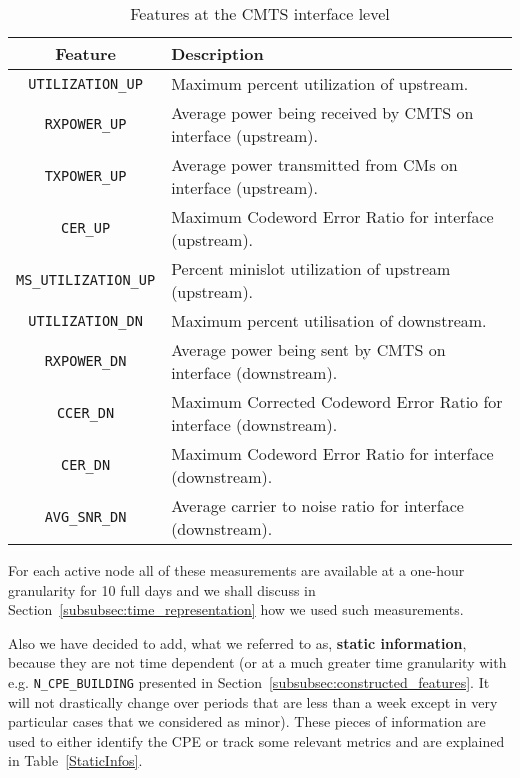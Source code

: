 \begin{table}[h]
\begin{center}
\begin{tabular}{c l}
\hline
\textbf{Feature} & \textbf{Description}\\ 
\hline\hline
\texttt{UTILIZATION\_UP} & Maximum percent utilization of upstream.\\
\hline
\texttt{RXPOWER\_UP} & Average power being received by CMTS on interface (upstream).\\
\hline
\texttt{TXPOWER\_UP} & Average power transmitted from CMs on interface (upstream).\\
\hline
\texttt{CER\_UP} & Maximum Codeword Error Ratio for interface (upstream).\\
\hline
\texttt{MS\_UTILIZATION\_UP} & Percent minislot utilization of upstream (upstream).\\
\hline
\hline
\texttt{UTILIZATION\_DN} & Maximum percent utilisation of downstream.\\
\hline
\texttt{RXPOWER\_DN} & Average power being sent by CMTS on interface (downstream).\\
\hline
\texttt{CCER\_DN} & Maximum Corrected Codeword Error Ratio for interface (downstream).\\
\hline
\texttt{CER\_DN} & Maximum Codeword Error Ratio for interface (downstream).\\
\hline
\texttt{AVG\_SNR\_DN} & Average carrier to noise ratio for interface (downstream).\\
\end{tabular}
\end{center}
\caption{\label{CMTSMes}Features at the CMTS interface level}
\end{table}

For each active node all of these measurements are available at a one-hour granularity for 10 full days and we shall discuss in Section~\ref{subsubsec:time_representation} how we used such measurements.

Also we have decided to add, what we referred to as, \textbf{static information}, because they are not time dependent (or at a much greater time granularity with e.g. \texttt{N\_CPE\_BUILDING} presented in Section~\ref{subsubsec:constructed_features}. It will not drastically change over periods that are less than a week except in very particular cases that we considered as minor). These pieces of information are used to either identify the CPE or track some relevant metrics and are explained in Table~\ref{StaticInfos}.

